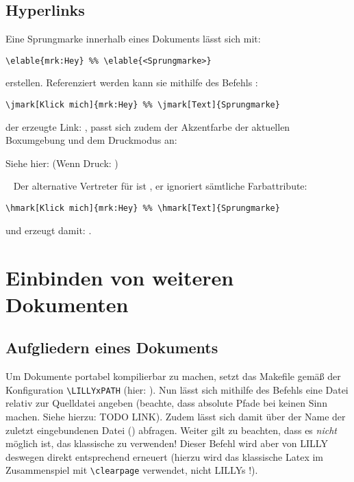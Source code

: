 \subsection{Hyperlinks}
Eine Sprungmarke innerhalb eines Dokuments lässt sich mit:
\begin{lstlisting}[style=latex]
\elable{mrk:Hey} %% \elable{<Sprungmarke>}
\end{lstlisting}
erstellen. Referenziert werden kann sie mithilfe des Befehls \textbf{}:
\begin{lstlisting}[style=latex]
\jmark[Klick mich]{mrk:Hey} %% \jmark[Text]{Sprungmarke}
\end{lstlisting}
der erzeugte Link: , passt sich zudem der Akzentfarbe der aktuellen Boxumgebung und dem Druckmodus an:\smallskip
\begin{zusammenfassung}[Testzusammenfassung]
Siehe hier:  (Wenn Druck: )
\end{zusammenfassung}~\smallskip\newline
{}Der alternative Vertreter für \textbf{} ist \textbf{}, er ignoriert sämtliche Farbattribute:
\begin{lstlisting}[style=latex]
\hmark[Klick mich]{mrk:Hey} %% \hmark[Text]{Sprungmarke}
\end{lstlisting}
und erzeugt damit: . 

\section{Einbinden von weiteren Dokumenten}
\subsection{Aufgliedern eines Dokuments}
Um Dokumente portabel kompilierbar zu machen, setzt das Makefile gemäß der Konfiguration \verb|\LILLYxPATH| (hier: \T{\LILLYxPATH}). Nun lässt sich mithilfe des Befehls  eine Datei relativ zur Quelldatei angeben (beachte, dass absolute Pfade bei  keinen Sinn machen. Siehe hierzu: TODO LINK).
Zudem lässt sich damit über  der Name der zuletzt eingebundenen Datei (\T{\LILLYxDOCUMENTxSUBNAME}) abfragen.\newline
{}Weiter gilt zu beachten, dass es \emph{nicht} möglich ist, das klassische \verb|| zu verwenden! Dieser Befehl wird aber von LILLY deswegen direkt entsprechend erneuert (hierzu wird das klassische Latex \verb|| im Zusammenspiel mit \verb|\clearpage| verwendet, nicht LILLYs !).
